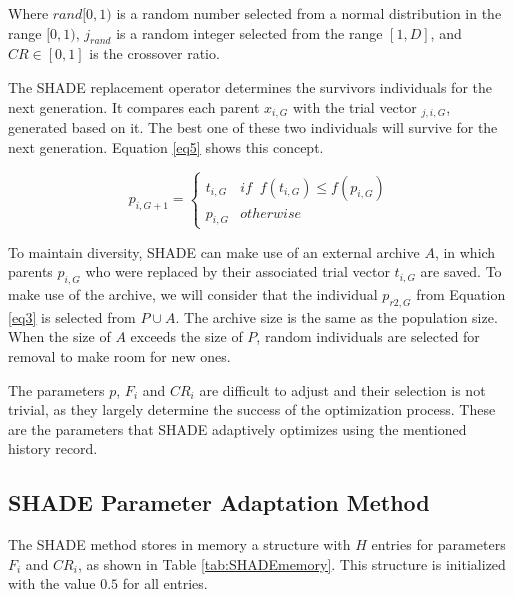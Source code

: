 \documentclass[review]{elsarticle}
\begin{document}
Where $rand[0,1)$ is a random number selected from a normal distribution in the range $[0,1)$, $j_{rand}$ is a random integer selected from the range $[1,D]$, and $CR \in [0,1]$ is the crossover ratio.

The SHADE replacement operator determines the survivors individuals for the next generation. It compares each parent $x_{i,G}$ with the trial vector $_{j,i,G}$, generated based on it. The best one of these two individuals will survive for the next generation. Equation \eqref{eq5} shows this concept.

\begin{equation}
p_{i,G + 1} = \left\{ \begin{array}{lc}
t_{i,G} &   if \;\; f(t_{i,G}) \le f(p_{i,G}) \\
p_{i,G} &  otherwise
\end{array}
\right.
\label{eq5}
\end{equation}

To maintain diversity, SHADE can make use of an external archive $A$, in which parents $p_{i,G}$ who were replaced by their associated trial vector $t_{i,G}$ are saved. To make use of the archive, we will consider that the individual $p_{r2,G}$ from Equation \eqref{eq3} is selected from $P \cup A$. The archive size is the same as the population size. When the size of $A$ exceeds the size of $P$, random individuals are selected for removal to make room for new ones.

The parameters $p$, $F_i$ and $CR_i$ are difficult to adjust and their selection is not trivial, as they largely determine the success of the optimization process. These are the parameters that SHADE adaptively optimizes using the mentioned history record.

\subsection{SHADE Parameter Adaptation Method}

The SHADE method stores in memory a structure with $H$ entries for parameters $F_i$ and $CR_i$, as shown in Table \ref{tab:SHADEmemory}. This structure is initialized with the value $0.5$ for all entries.

\begin{table}[!h]
	\centering
	\setlength{\tabcolsep}{13pt}
	\caption{Historical memory $M_{CR}$, $M_{F}$ used by SHADE \cite{tanabe2013success}}
	\label{tab:SHADEmemory}
\end{table}
\end{document}
